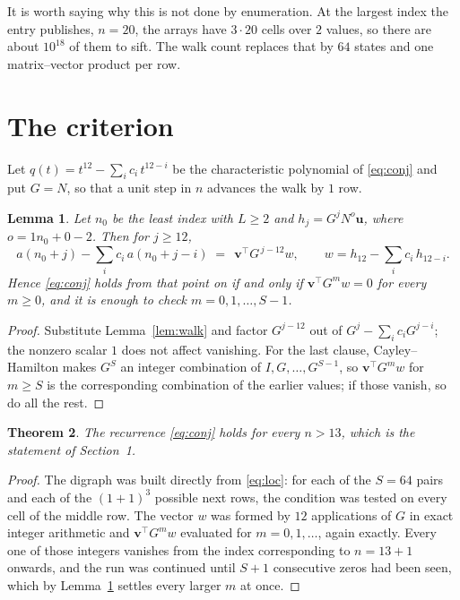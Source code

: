 \documentclass[11pt,a4paper]{article}
\theoremstyle{plain}
\newtheorem{theorem}{Theorem}
\newtheorem{lemma}[theorem]{Lemma}
\theoremstyle{definition}
\begin{document}
It is worth saying why this is not done by enumeration. At the largest index the entry
publishes, $n=20$, the arrays have $3\cdot20$ cells over
$2$ values, so there are about $10^{18}$ of them to sift. The
walk count replaces that by $64$ states and one matrix--vector product per row.
\section{The criterion}

Let $q(t)=t^{12}-\sum_i c_i\,t^{12-i}$ be the characteristic polynomial of
\eqref{eq:conj} and put $G=N$, so that a unit step in $n$ advances the walk by
$1$ row.

\begin{lemma}\label{lem:crit}
Let $n_0$ be the least index with $L\ge2$ and $h_j=G^{j}N^{o}\mathbf{u}$, where
$o=1n_0+0-2$. Then for $j\ge12$,
\[
a(n_0+j)-\sum_i c_i\,a(n_0+j-i)\;=\;\,\mathbf{v}^{\!\top}G^{\,j-12}w,
\qquad w=h_{12}-\sum_i c_i\,h_{12-i} .
\]
Hence \eqref{eq:conj} holds from that point on if and only if
$\mathbf{v}^{\!\top}G^{m}w=0$ for every $m\ge0$, and it is enough to check
$m=0,1,\dots,S-1$.
\end{lemma}

\begin{proof}
Substitute Lemma~\ref{lem:walk} and factor $G^{j-12}$ out of
$G^{j}-\sum_ic_iG^{j-i}$; the nonzero scalar $1$ does not affect
vanishing. For the last clause, Cayley--Hamilton makes $G^{S}$ an integer combination of
$I,G,\dots,G^{S-1}$, so $\mathbf{v}^{\!\top}G^{m}w$ for $m\ge S$ is the corresponding
combination of the earlier values; if those vanish, so do all the rest.
\end{proof}

\begin{theorem}
The recurrence \eqref{eq:conj} holds for every $n>13$, which is the statement of
Section~1.
\end{theorem}

\begin{proof}
The digraph was built directly from \eqref{eq:loc}: for each of the $S=64$ pairs and each
of the $(1+1)^{3}$ possible next rows, the condition was tested on every cell of
the middle row. The vector $w$ was formed by $12$ applications of $G$ in exact integer
arithmetic and $\mathbf{v}^{\!\top}G^{m}w$ evaluated for $m=0,1,\dots$, again exactly.
Every one of those integers vanishes from the index corresponding to $n=13+1$ onwards,
and the run was continued until $S+1$ consecutive zeros had been seen, which by
Lemma~\ref{lem:crit} settles every larger $m$ at once.
\end{proof}
\end{document}
